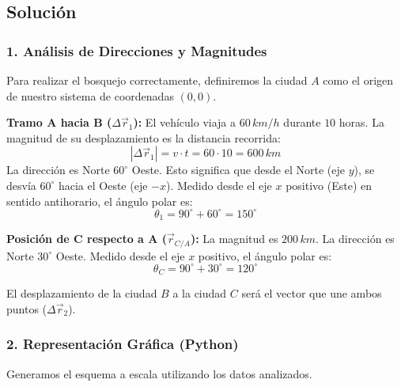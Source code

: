 \documentclass[12pt, a4paper]{article}
\begin{document}
\subsection*{Solución}

\subsubsection*{1. Análisis de Direcciones y Magnitudes}
Para realizar el bosquejo correctamente, definiremos la ciudad $A$ como el origen de nuestro sistema de coordenadas $(0,0)$.

\textbf{Tramo A hacia B ($\Delta\vec{r}_1$):}
El vehículo viaja a $60 \, \si{km/h}$ durante $10$ horas. La magnitud de su desplazamiento es la distancia recorrida:
$$ |\Delta\vec{r}_1| = v \cdot t = 60 \cdot 10 = 600 \, \si{km} $$
La dirección es Norte $60^\circ$ Oeste. Esto significa que desde el Norte (eje $y$), se desvía $60^\circ$ hacia el Oeste (eje $-x$). Medido desde el eje $x$ positivo (Este) en sentido antihorario, el ángulo polar es:
$$ \theta_1 = 90^\circ + 60^\circ = 150^\circ $$

\textbf{Posición de C respecto a A ($\vec{r}_{C/A}$):}
La magnitud es $200 \, \si{km}$.
La dirección es Norte $30^\circ$ Oeste. Medido desde el eje $x$ positivo, el ángulo polar es:
$$ \theta_C = 90^\circ + 30^\circ = 120^\circ $$

El desplazamiento de la ciudad $B$ a la ciudad $C$ será el vector que une ambos puntos ($\Delta\vec{r}_2$).

\subsubsection*{2. Representación Gráfica (Python)}
Generamos el esquema a escala utilizando los datos analizados.
\end{document}
